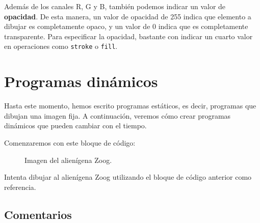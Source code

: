 \documentclass[
  spanish,
  11pt,
  a4paper,
  DIV=11,
  numbers=noendperiod]{scrartcl}
\begin{document}
\label{opacidad}

Además de los canales R, G y B, también podemos indicar un valor de \textbf{opacidad}. De esta manera, un valor de opacidad de 255 indica que elemento a dibujar es completamente opaco, y un valor de 0 indica que es completamente transparente. Para especificar la opacidad, bastante con indicar un cuarto valor en operaciones como \texttt{stroke} o \texttt{fill}.


\section{Programas dinámicos}

\label{programas-dinámicos}

Hasta este momento, hemos escrito programas estáticos, es decir, programas que dibujan una imagen fija. A continuación, veremos cómo crear programas dinámicos que pueden cambiar con el tiempo.

Comenzaremos con este bloque de código:


\begin{figure}

\caption{\label{fig-zoog}Imagen del alienígena Zoog.}

\end{figure}%

\begin{tcolorbox}[enhanced jigsaw, toprule=.15mm, coltitle=black, titlerule=0mm, opacitybacktitle=0.6, breakable, colback=white, colframe=quarto-callout-note-color-frame, colbacktitle=quarto-callout-note-color!10!white, opacityback=0, title={Ejercicio 10 - Dibuja a Zoog}, bottomtitle=1mm, rightrule=.15mm, toptitle=1mm, left=2mm, bottomrule=.15mm, leftrule=.75mm, arc=.35mm]

Intenta dibujar al alienígena Zoog utilizando el bloque de código anterior como referencia.

\end{tcolorbox}

\subsection{Comentarios}

\label{comentarios}
\end{document}
